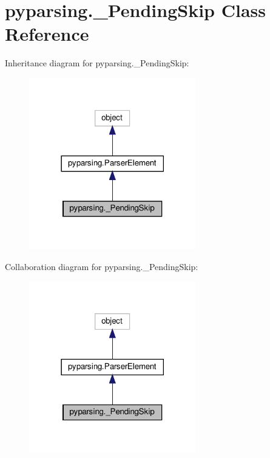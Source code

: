 \hypertarget{classpyparsing_1_1__PendingSkip}{}\section{pyparsing.\+\_\+\+Pending\+Skip Class Reference}
\label{classpyparsing_1_1__PendingSkip}


Inheritance diagram for pyparsing.\+\_\+\+Pending\+Skip\+:
\nopagebreak
\begin{figure}[H]
\begin{center}
\leavevmode
\includegraphics[width=206pt]{classpyparsing_1_1__PendingSkip__inherit__graph}
\end{center}
\end{figure}


Collaboration diagram for pyparsing.\+\_\+\+Pending\+Skip\+:
\nopagebreak
\begin{figure}[H]
\begin{center}
\leavevmode
\includegraphics[width=206pt]{classpyparsing_1_1__PendingSkip__coll__graph}
\end{center}
\end{figure}
